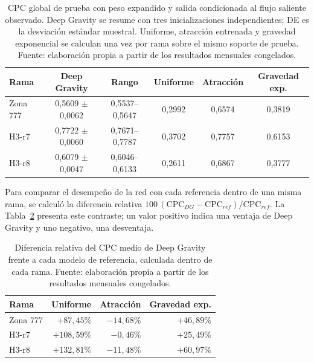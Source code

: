 \begin{table}[H]
\centering
\small
\renewcommand{\arraystretch}{1.15}
\caption{CPC global de prueba con peso expandido y salida condicionada al flujo saliente observado. Deep Gravity se resume con tres inicializaciones independientes; DE es la desviación estándar muestral. Uniforme, atracción entrenada y gravedad exponencial se calculan una vez por rama sobre el mismo soporte de prueba. Fuente: elaboración propia a partir de los resultados mensuales congelados.}
\label{tab:resultados_prueba}
\begin{tabular*}{\textwidth}{@{\extracolsep{\fill}}lccccc@{}}
\toprule
\textbf{Rama} & \textbf{Deep Gravity} & \textbf{Rango} & \textbf{Uniforme} & \textbf{Atracción} & \textbf{Gravedad exp.} \\
\midrule
Zona 777 & 0,5609 $\pm$ 0,0062 & 0,5537--0,5647 & 0,2992 & 0,6574 & 0,3819 \\
H3-r7 & 0,7722 $\pm$ 0,0060 & 0,7671--0,7787 & 0,3702 & 0,7757 & 0,6153 \\
H3-r8 & 0,6079 $\pm$ 0,0047 & 0,6046--0,6133 & 0,2611 & 0,6867 & 0,3777 \\
\bottomrule
\end{tabular*}
\end{table}

Para comparar el desempeño de la red con cada referencia dentro de una misma rama, se calculó la diferencia relativa $100\,(\mathrm{CPC}_{DG}-\mathrm{CPC}_{ref})/\mathrm{CPC}_{ref}$. La Tabla~\ref{tab:brechas_relativas_cpc} presenta este contraste; un valor positivo indica una ventaja de Deep Gravity y uno negativo, una desventaja.

\begin{table}[H]
\centering
\small
\renewcommand{\arraystretch}{1.12}
\caption{Diferencia relativa del CPC medio de Deep Gravity frente a cada modelo de referencia, calculada dentro de cada rama. Fuente: elaboración propia a partir de los resultados mensuales congelados.}
\label{tab:brechas_relativas_cpc}
\begin{tabular*}{\textwidth}{@{\extracolsep{\fill}}lrrr@{}}
\toprule
\textbf{Rama} & \textbf{Uniforme} & \textbf{Atracción} & \textbf{Gravedad exp.} \\
\midrule
Zona 777 & $+87{,}45\%$ & $-14{,}68\%$ & $+46{,}89\%$ \\
H3-r7 & $+108{,}59\%$ & $-0{,}46\%$ & $+25{,}49\%$ \\
H3-r8 & $+132{,}81\%$ & $-11{,}48\%$ & $+60{,}97\%$ \\
\bottomrule
\end{tabular*}
\end{table}

